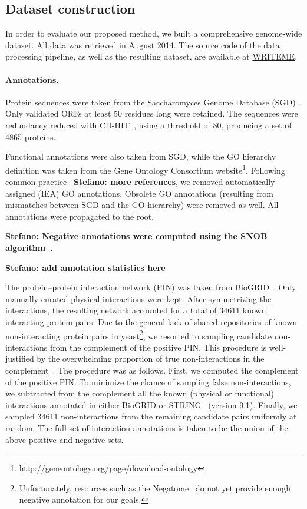 \documentclass{bioinfo}
\newcommand{\stefano}[1]{{\bf \textcolor{alizarin}{{Stefano: #1}}}}
\begin{document}
\subsection{Dataset construction}

In order to evaluate our proposed method, we built a comprehensive genome-wide
dataset. All data was retrieved in August 2014.  The source code of the data
processing pipeline, as well as the resulting dataset, are available at
\url{WRITEME}.

\paragraph{Annotations.} Protein sequences were taken from the Saccharomyces
Genome Database (SGD)~\cite{cherry2012sgd}. Only validated ORFs at least 50
residues long were retained. The sequences were redundancy reduced with
CD-HIT~\cite{fu2012cdhit}, using a threshold of 80, producing a set of 4865
proteins.

Functional annotations were also taken from SGD, while the GO hierarchy
definition was taken from the Gene Ontology Consortium website\footnote{
\url{http://geneontology.org/page/download-ontology}}. Following common
practice~\cite{gong2016gofdr} \stefano{more references}, we removed
automatically assigned (IEA) GO annotations. Obsolete GO annotations (resulting
from mismatches between SGD and the GO hierarchy) were removed as well. All
annotations were propagated to the root.

\stefano{Negative annotations were computed using the SNOB algorithm~\cite{youngs2014negative}.}

\stefano{add annotation statistics here}

The protein--protein interaction network (PIN) was taken from
BioGRID~\cite{chatr2015biogrid}. Only manually curated physical interactions
were kept. After symmetrizing the interactions, the resulting network accounted
for a total of 34611 known interacting protein pairs. Due to the general lack
of shared repositories of known non-interacting protein pairs in
yeast\footnote{Unfortunately, resources such as the
Negatome~\cite{blohm2013negatome} do not yet provide enough negative annotation
for our goals.}, we resorted to sampling candidate non-interactions from the
complement of the positive PIN.  This procedure is well-justified by the
overwhelming proportion of true non-interactions in the
complement~\cite{park2011revisiting}. The procedure was as follows. First, we
computed the complement of the positive PIN. To minimize the chance of sampling
false non-interactions, we subtracted from the complement all the known
(physical or functional) interactions annotated in either BioGRID or
STRING~\cite{franceschini2013string91,szklarczyk2014string10} (version 9.1).
Finally, we sampled 34611 non-interactions from the remaining candidate pairs
uniformly at random. The full set of interaction annotations is taken to be the
union of the above positive and negative sets.
\end{document}
